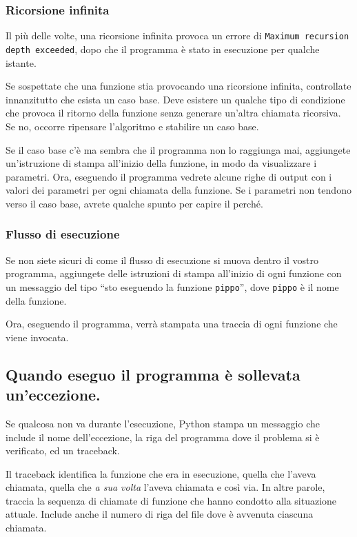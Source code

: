 \documentclass[10pt]{book}
\begin{document}
\subsubsection{Ricorsione infinita}

Il più delle volte, una ricorsione infinita provoca un errore di {\tt Maximum recursion depth exceeded}, dopo che il programma è stato in esecuzione per qualche istante.

Se sospettate che una funzione stia provocando una ricorsione infinita, controllate innanzitutto che esista un caso base. Deve esistere un qualche tipo di condizione che provoca il ritorno della funzione senza generare un'altra chiamata ricorsiva. Se no, occorre ripensare l'algoritmo e stabilire un caso base.

Se il caso base c'è ma sembra che il programma non lo raggiunga mai, aggiungete un'istruzione di stampa all'inizio della funzione, in modo da visualizzare i parametri. Ora, eseguendo il programma vedrete alcune righe di output con i valori dei parametri per ogni chiamata della funzione. Se i parametri non tendono verso il caso base, avrete qualche spunto per capire il perché.


\subsubsection{Flusso di esecuzione}

Se non siete sicuri di come il flusso di esecuzione si muova dentro il vostro programma, aggiungete delle istruzioni di stampa all'inizio di ogni funzione con un messaggio del tipo ``sto eseguendo la funzione {\tt pippo}'', dove
{\tt pippo} è il nome della funzione.

Ora, eseguendo il programma, verrà stampata una traccia di ogni funzione che viene invocata.


\subsection{Quando eseguo il programma è sollevata un'eccezione.}

Se qualcosa non va durante l'esecuzione, Python stampa un messaggio che include il nome dell'eccezione, la riga del programma dove il problema si è verificato, ed un traceback.

Il traceback identifica la funzione che era in esecuzione, quella che l'aveva chiamata, quella che {\em a sua volta} l'aveva chiamata e così via. In altre parole, traccia la sequenza di chiamate di funzione che hanno condotto alla situazione attuale. Include anche il numero di riga del file dove è avvenuta ciascuna chiamata.
\end{document}
